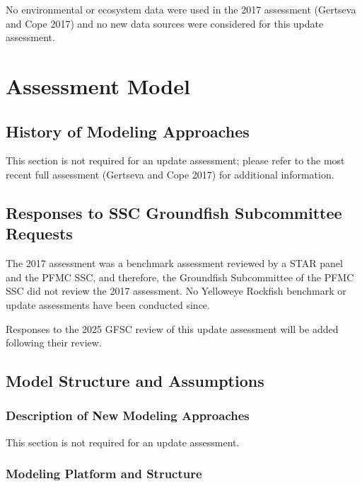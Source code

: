 \documentclass[
]{scrartcl}
\begin{document}
No environmental or ecosystem data were used in the 2017 assessment
(Gertseva and Cope 2017) and no new data sources were considered for
this update assessment.

\newpage{}

\section{Assessment Model}\label{assessment-model}

\subsection{History of Modeling
Approaches}\label{history-of-modeling-approaches}

This section is not required for an update assessment; please refer to
the most recent full assessment (Gertseva and Cope 2017) for additional
information.

\subsection{Responses to SSC Groundfish Subcommittee
Requests}\label{responses-to-ssc-groundfish-subcommittee-requests}

The 2017 assessment was a benchmark assessment reviewed by a STAR panel
and the PFMC SSC, and therefore, the Groundfish Subcommittee of the PFMC
SSC did not review the 2017 assessment. No Yelloweye Rockfish benchmark
or update assessments have been conducted since.

Responses to the 2025 GFSC review of this update assessment will be
added following their review.

\subsection{Model Structure and Assumptions}\label{sec-bridge}

\subsubsection{Description of New Modeling
Approaches}\label{description-of-new-modeling-approaches}

This section is not required for an update assessment.

\subsubsection{Modeling Platform and
Structure}\label{modeling-platform-and-structure}
\end{document}
